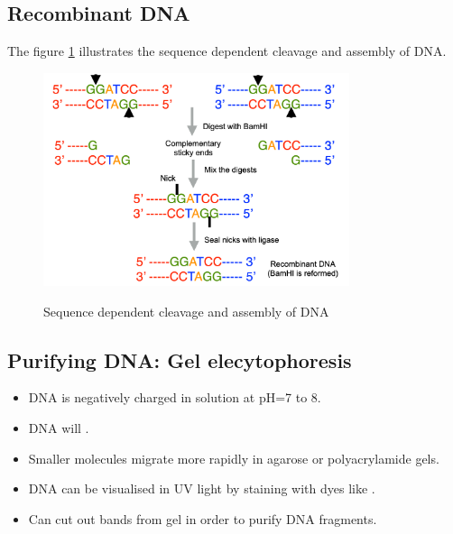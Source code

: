 \subsection{Recombinant DNA}
The figure \ref{Fig4-2} illustrates the sequence dependent cleavage and assembly of DNA.
\begin{figure}[h]
\centering
\includegraphics[width=0.8\textwidth]{images/lecture4-2.png}\\[.2in]
\caption{Sequence dependent cleavage and assembly of DNA} 
\label{Fig4-2}
\end{figure}
\subsection{Purifying DNA: Gel elecytophoresis}
\begin{itemize}
    \item DNA is negatively charged in solution at pH=7 to 8.
    \item DNA will .
    \item Smaller molecules migrate more rapidly in agarose or polyacrylamide gels.
    \item DNA can be visualised in UV light by staining with dyes like .
    \item Can cut out bands from gel in order to purify DNA fragments.
\end{itemize}
